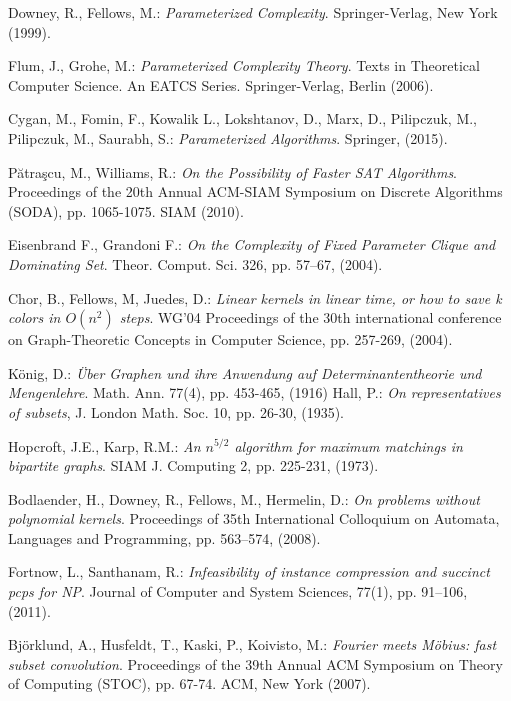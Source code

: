 \documentclass[en]{pracamgr}
\theoremstyle{definition}
\begin{document}
\begin{thebibliography}{99}

  Downey, R., Fellows, M.: \textit{Parameterized Complexity}. Springer-Verlag, New York (1999).

 Flum, J., Grohe, M.: \textit{Parameterized Complexity Theory}. Texts in Theoretical Computer Science. An EATCS Series. Springer-Verlag, Berlin (2006).

 Cygan, M., Fomin, F., Kowalik L., Lokshtanov, D., Marx, D., Pilipczuk, M., Pilipczuk, M., Saurabh, S.: \textit{Parameterized Algorithms}. Springer, (2015).

 Pătraşcu, M., Williams, R.: \textit{On the Possibility of Faster SAT Algorithms}. Proceedings of the 20th Annual ACM-SIAM Symposium on Discrete Algorithms (SODA), pp. 1065-1075. SIAM (2010).

 Eisenbrand F., Grandoni F.: \textit{On the
Complexity of Fixed Parameter Clique and Dominating Set}. Theor. Comput. Sci. 326, pp. 57–67, (2004).

 Chor, B., Fellows, M, Juedes, D.: \textit{Linear kernels in linear time, or how to save k colors in $O(n^2)$ steps}. WG'04 Proceedings of the 30th international conference on Graph-Theoretic Concepts in Computer Science, pp. 257-269, (2004).

 König, D.: \textit{Über Graphen und ihre Anwendung auf Determinantentheorie und Mengenlehre}. Math. Ann. 77(4), pp. 453-465, (1916)
 Hall, P.: \textit{On representatives of subsets}, J. London Math. Soc. 10, pp. 26-30, (1935).

 Hopcroft, J.E., Karp, R.M.: \textit{An $n^{5/2}$ algorithm for maximum matchings in bipartite graphs}. SIAM J. Computing 2, pp. 225-231, (1973).

 Bodlaender, H., Downey, R., Fellows, M., Hermelin, D.: \textit{On problems without polynomial kernels}. Proceedings of 35th International Colloquium on Automata, Languages and Programming, pp. 563–574, (2008).

 Fortnow, L., Santhanam, R.: \textit{Infeasibility of instance compression and succinct pcps for NP}. Journal of Computer and System Sciences, 77(1), pp. 91–106, (2011).

 Björklund, A., Husfeldt, T., Kaski, P., Koivisto, M.: \textit{Fourier meets Möbius: fast subset convolution}. Proceedings of the 39th Annual ACM Symposium on Theory of Computing (STOC), pp. 67-74. ACM, New York (2007).



\end{thebibliography}
\end{document}
